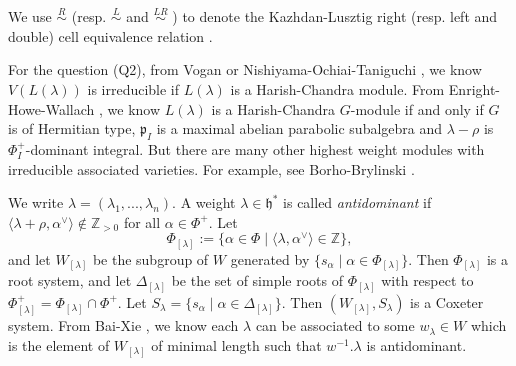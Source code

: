 \documentclass{amsart}[12pt]
\newtheorem{Thm}[Lem]{Theorem}
\newcommand{\Wsmall}{W_{[\lambda]}}
\newcommand{\al}{\alpha}
\newcommand{\mf}[1]{\mathfrak{#1}}
\newcommand{\bil}[2]{\langle{#1},{#2}^{\vee} \rangle }
\newcommand{\hs}{ \mathfrak{h}^*}
\numberwithin{equation}{section}
\begin{document}
We use $\stackrel{R}{\sim}$ (resp. $\stackrel{L}{\sim}$ and $\stackrel{LR}{\sim}$ ) to denote the Kazhdan-Lusztig right (resp. left and double) cell equivalence relation \cite{KL} .
%


For the question (Q2), from Vogan \cite{Vo91} or Nishiyama-Ochiai-Taniguchi \cite{NOT}, we know  $V(L(\lambda)) $ is irreducible if  $L(\lambda) $ is a Harish-Chandra module.   From Enright-Howe-Wallach \cite{EHW}, we know  $L(\lambda) $ is a Harish-Chandra $G$-module if and only if $G$ is of Hermitian type, $\mathfrak{p}_I$ is a maximal abelian parabolic subalgebra and $\lambda-\rho$ is $\Phi_I^+$-dominant integral. But there are many other highest weight modules with irreducible associated varieties. For example, see Borho-Brylinski \cite[Corollary 4.3]{BoB3}.


We write $\lambda=(\lambda_1,...,\lambda_n)$.
 A weight $ \lambda\in\hs $ is called \textit{antidominant} if $ \bil{\lambda+\rho}{\al} \notin\mathbb{Z}_{>0}$ for all $ \al\in\Phi^+ $. Let   \begin{equation}\label{eq:phil}
\Phi_{[\lambda]}:=\{\al\in\Phi\mid \bil{\lambda}{\al}\in\mathbb{Z} \},
\end{equation}
and let $ \Wsmall $ be the subgroup of $ W $ generated by $ \{s_\al\mid \al\in\Phi_{[\lambda]} \} $.
Then $\Phi_{[\lambda]}  $ is a root system, and let $ \Delta_{[\lambda]} $ be the set of simple roots of $ \Phi_{[\lambda]} $ with respect to  $ \Phi_{[\lambda]}^+=\Phi_{[\lambda]}\cap\Phi^+$.
Let $ S_\lambda=\{s_\alpha\mid \alpha\in \Delta_{[\lambda]} \} $. Then $ (\Wsmall,S_\lambda) $ is a Coxeter system.
From Bai-Xie \cite{BX}, we know each $\lambda$ can be associated to some $w_{\lambda}\in W$ which is the element of $ \Wsmall $ of minimal length such that $ w^{-1}.\lambda $ is antidominant.
\end{document}
